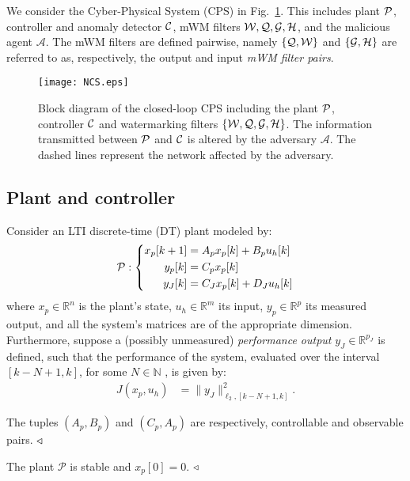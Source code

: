 

We consider the Cyber-Physical System (CPS) in Fig.~\ref{fig:sys}. This includes plant $\mathcal{P}$, controller and anomaly detector $\mathcal{C}$, mWM filters $\mathcal{W},\mathcal{Q},\mathcal{G},\mathcal{H}$, and the malicious agent $\mathcal{A}$. The mWM filters are defined pairwise, namely $\{\mathcal{Q},\mathcal{W}\}$ and $\{\mathcal{G},\mathcal{H}\}$ are referred to as, respectively, the output and input \textit{mWM filter pairs}. 

\begin{figure}
    \centering
    \texttt{[image: NCS.eps]}
    \caption{Block diagram of the closed-loop CPS including the plant $\mathcal{P}$, controller $\mathcal{C}$ and watermarking filters $\{\mathcal{W},\mathcal{Q},\mathcal{G},\mathcal{H}\}$. The information transmitted between $\mathcal{P}$ and $\mathcal{C}$ is altered by the adversary $\mathcal A$. The dashed lines represent the network affected by the adversary.}
    \label{fig:sys}
\end{figure}

\subsection{Plant and controller}
Consider an LTI discrete-time (DT) plant modeled by: 
	\begin{equation}\label{eq:sys}
	    \mathcal{P}: \left\{ \begin{aligned}
	        x_p[k+1] &= A_p x_p[k] + B_p u_h[k]\\
	        y_p[k] &= C_p x_p[k]\\
            y_J[k] &= C_J x_p[k] + D_J u_h[k]
	    \end{aligned}\right.
	\end{equation}
	where $x_p \in \mathbb R^n$ is the plant's state, $u_h \in \mathbb R^m$ its input, $y_p \in \mathbb R^p$ its measured output, and all the system's matrices are of the appropriate dimension. Furthermore, suppose a (possibly unmeasured) \textit{performance output} $y_J \in \mathbb{R}^{p_J}$ is defined, such that the performance of the system, evaluated over the interval $[k-N+1,k]$, for some $N \in \mathbb{N}$ \citep{zhou1996robust}, is given by:
	\begin{align}
	    J(x_p,u_h) &= %
        \|y_J\|^2_{\ell_2,[k-N+1,k]}.
	\end{align}
    \begin{assumption}
    The tuples $(A_p,B_p)$ and $(C_p,A_p)$ are respectively, controllable and observable pairs.
		$\hfill\triangleleft$
	\end{assumption}
 \begin{assumption}\label{ass:stable}
     The plant $\mathcal{P}$ is stable and $x_p[0]=0$. $\hfill\triangleleft$
 \end{assumption}

